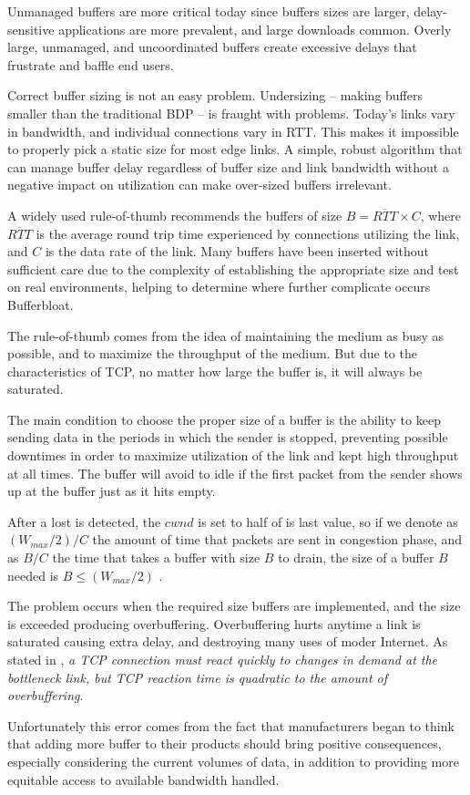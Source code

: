 Unmanaged buffers are more critical today since buffers sizes are larger,
delay-sensitive applications are more prevalent, and large downloads common.
Overly large, unmanaged, and uncoordinated buffers create excessive delays
that frustrate and baffle end users.

Correct buffer sizing is not an easy problem. Undersizing -- making buffers
smaller than the traditional BDP -- is fraught with problems. Today's links vary
in bandwidth, and individual connections vary in RTT. This makes it impossible
to properly pick a static size for most edge links. A simple, robust algorithm
that can manage buffer delay regardless of buffer size and link bandwidth
without a negative impact on utilization can make over-sized buffers
irrelevant.

A widely used rule-of-thumb recommends the buffers of size $B = \overline{RTT}
\times C $, where $\overline{RTT}$ is the average round trip time experienced by
connections utilizing the link, and $C$ is the data rate of the link. Many
buffers have been inserted without sufficient care due to the complexity of
establishing the appropriate size and test on real environments\cite{Vu-Brugier},
helping to determine where further complicate occurs Bufferbloat.

The rule-of-thumb comes from the idea of maintaining the medium as
busy as possible, and to maximize the throughput of the medium. But due to the
characteristics of TCP, no matter how large the buffer is, it will always be
saturated.

The main condition to choose the proper size of a buffer is the ability to
keep sending data in the periods in which the sender is stopped, preventing
possible downtimes in order to maximize utilization of the link and kept high
throughput at all times. The buffer will avoid to idle if the first packet
from the sender shows up at the buffer just as it hits empty.

After a lost is detected, the $cwnd$ is set to half of is last value, so if we
denote as $(W_{max} /2)/C$ the amount of time that packets are sent in
congestion phase, and as $B/C$ the time that takes a buffer with size $B$ to
drain, the size of a buffer $B$ needed is $B \leq (W_{max} /2)$
\cite{main:ref:1}.

The problem occurs when the required size buffers are implemented, and the
size is exceeded producing overbuffering. Overbuffering hurts anytime a link
is saturated causing extra delay, and destroying many uses of moder Internet.
As stated in \cite{GettysNichols}, \textit{a TCP connection must react quickly
to changes in demand at the bottleneck link, but TCP reaction time is
quadratic to the amount of overbuffering}.

Unfortunately this error comes from the fact that manufacturers began to think
that adding more buffer to their products should bring positive consequences,
especially considering the current volumes of data, in addition to providing
more equitable access to available bandwidth handled.
